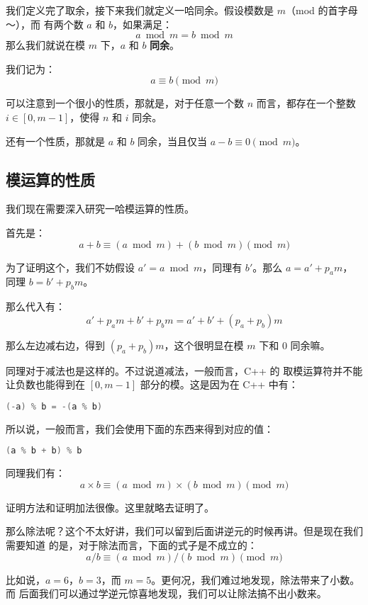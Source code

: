 \begin{frame}
我们定义完了取余，接下来我们就定义一哈同余。假设模数是 $m$（mod 的首字母～），而
有两个数 $a$ 和 $b$，如果满足：\[
    a \bmod m = b \bmod m
\]\pause
那么我们就说在模 $m$ 下，$a$ 和 $b$ \textbf{同余}。

我们记为：\[
    a \equiv b \pmod m
\]
\end{frame}

\begin{frame}
可以注意到一个很小的性质，那就是，对于任意一个数 $n$ 而言，都存在一个整数 $i \in
[0, m - 1]$，使得 $n$ 和 $i$ 同余。

还有一个性质，那就是 $a$ 和 $b$ 同余，当且仅当 $a - b \equiv 0 \pmod m$。
\end{frame}

\subsection{模运算的性质}

\begin{frame}
我们现在需要深入研究一哈模运算的性质。

首先是：\[
    a + b \equiv (a \bmod m) + (b \bmod m) \pmod m
\] \pause

为了证明这个，我们不妨假设 $a' = a \bmod m$，同理有 $b'$。那么 $a = a' + p_a m$，
同理 $b = b' + p_b m$。

那么代入有：\[
    a' + p_a m + b' + p_b m = a' + b' + (p_a + p_b) m
\]

那么左边减右边，得到 $(p_a + p_b) m$，这个很明显在模 $m$ 下和 $0$ 同余嘛。
\end{frame}

\begin{frame}[fragile]
同理对于减法也是这样的。不过说道减法，一般而言，C++ 的 \cmd{\%} 取模运算符并不能
让负数也能得到在 $[0, m - 1]$ 部分的模。这是因为在 C++ 中有：
\begin{lstlisting}[language=C++]
(-a) % b = -(a % b)
\end{lstlisting}\pause
所以说，一般而言，我们会使用下面的东西来得到对应的值：
\begin{lstlisting}[language=C++]
(a % b + b) % b
\end{lstlisting}
\end{frame}

\begin{frame}
同理我们有：\[
    a \times b \equiv (a \bmod m) \times (b \bmod m) \pmod m
\] \pause

证明方法和证明加法很像。这里就略去证明了。
\end{frame}

\begin{frame}
那么除法呢？这个不太好讲，我们可以留到后面讲逆元的时候再讲。但是现在我们需要知道
的是，对于除法而言，下面的式子是不成立的：\[
    a / b \equiv (a \bmod m) / (b \bmod m) \pmod m
\]

比如说，$a = 6$，$b = 3$，而 $m = 5$。更何况，我们难过地发现，除法带来了小数。而
后面我们可以通过学逆元惊喜地发现，我们可以让除法搞不出小数来。
\end{frame}
